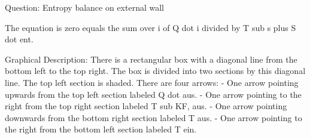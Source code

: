 Question: Entropy balance on external wall

The equation is zero equals the sum over i of Q dot i divided by T sub s plus S dot ent.

Graphical Description:
There is a rectangular box with a diagonal line from the bottom left to the top right. The box is divided into two sections by this diagonal line. The top left section is shaded. There are four arrows:
- One arrow pointing upwards from the top left section labeled Q dot aus.
- One arrow pointing to the right from the top right section labeled T sub KF, aus.
- One arrow pointing downwards from the bottom right section labeled T aus.
- One arrow pointing to the right from the bottom left section labeled T ein.